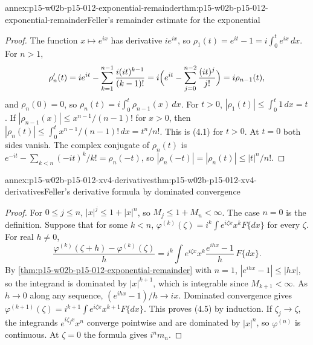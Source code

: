 \begin{annexitem}{annex:p15-w02b-p15-012-exponential-remainder}{thm:p15-w02b-p15-012-exponential-remainder}{Feller's remainder estimate for the exponential}
\begin{proof}
The function \(x\mapsto e^{ix}\) has derivative \(ie^{ix}\), so
\(\rho_1(t)=e^{it}-1=i\int_0^te^{ix}\,dx\). For \(n>1\),
\[
 \rho_n'(t)=ie^{it}-\sum_{k=1}^{n-1}\frac{i(it)^{k-1}}{(k-1)!}
   =i\Bigl(e^{it}-\sum_{j=0}^{n-2}\frac{(it)^j}{j!}\Bigr)=i\rho_{n-1}(t),
\]
and \(\rho_n(0)=0\), so \(\rho_n(t)=i\int_0^t\rho_{n-1}(x)\,dx\).
For \(t>0\), \(|\rho_1(t)|\leq\int_0^t1\,dx=t\). If
\(|\rho_{n-1}(x)|\leq x^{n-1}/(n-1)!\) for \(x>0\), then
\(|\rho_n(t)|\leq\int_0^tx^{n-1}/(n-1)!\,dx=t^n/n!\). This is (4.1) for
\(t>0\). At \(t=0\) both sides vanish. The complex conjugate of
\(\rho_n(t)\) is \(e^{-it}-\sum_{k<n}(-it)^k/k!=\rho_n(-t)\), so
\(|\rho_n(-t)|=|\rho_n(t)|\leq|t|^n/n!\).
\end{proof}
\end{annexitem}

\begin{annexitem}{annex:p15-w02b-p15-012-xv4-derivatives}{thm:p15-w02b-p15-012-xv4-derivatives}{Feller's derivative formula by dominated convergence}
\begin{proof}
For \(0\leq j\leq n\), \(|x|^j\leq1+|x|^n\), so \(M_j\leq1+M_n<\infty\).
The case \(n=0\) is the definition. Suppose that for some \(k<n\),
\(\varphi^{(k)}(\zeta)=i^k\int e^{i\zeta x}x^kF\{dx\}\) for every \(\zeta\).
For real \(h\neq0\),
\[
 \frac{\varphi^{(k)}(\zeta+h)-\varphi^{(k)}(\zeta)}h
   =i^k\int e^{i\zeta x}x^k\frac{e^{ihx}-1}h\,F\{dx\}.
\]
By \cref{thm:p15-w02b-p15-012-exponential-remainder} with \(n=1\),
\(|e^{ihx}-1|\leq|hx|\), so the integrand is dominated by \(|x|^{k+1}\),
which is integrable since \(M_{k+1}<\infty\). As \(h\to0\) along any sequence,
\((e^{ihx}-1)/h\to ix\). Dominated convergence gives
\(\varphi^{(k+1)}(\zeta)=i^{k+1}\int e^{i\zeta x}x^{k+1}F\{dx\}\). This proves
(4.5) by induction. If \(\zeta_j\to\zeta\), the integrands
\(e^{i\zeta_jx}x^n\) converge pointwise and are dominated by \(|x|^n\), so
\(\varphi^{(n)}\) is continuous. At \(\zeta=0\) the formula gives
\(i^nm_n\).
\end{proof}
\end{annexitem}


